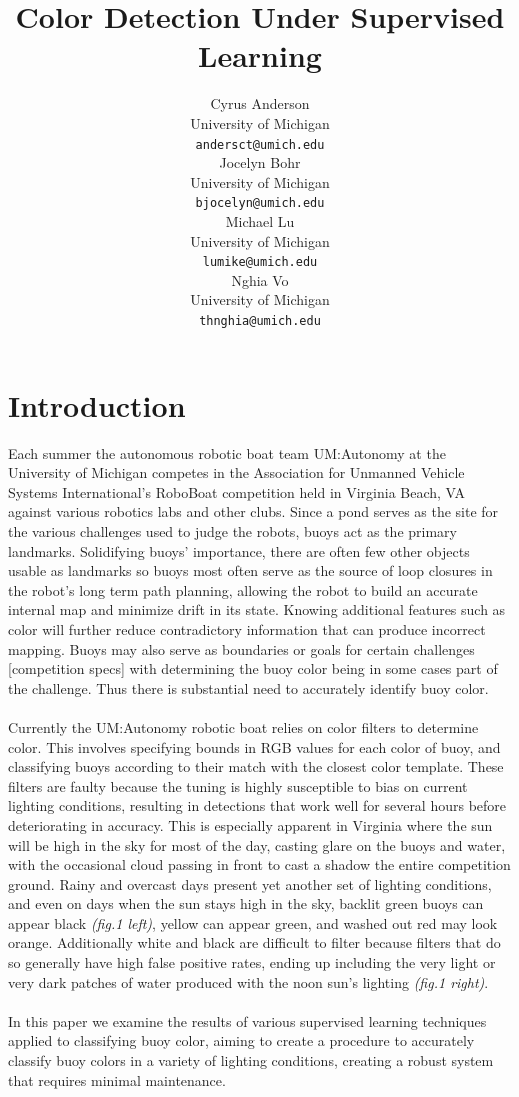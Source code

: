 \documentclass{article} %
\title{Color Detection Under Supervised Learning}
\author{
Cyrus Anderson \\
University of Michigan \\
\texttt{andersct@umich.edu} \\
\And
Jocelyn Bohr \\
University of Michigan \\
\texttt{bjocelyn@umich.edu} \\
\AND
Michael Lu \\
University of Michigan \\
\texttt{lumike@umich.edu} \\
\And
Nghia Vo \\
University of Michigan \\
\texttt{thnghia@umich.edu} \\
}
\begin{document}
\maketitle

\begin{abstract}

\end{abstract}

\section{Introduction}
Each summer the autonomous robotic boat team UM:Autonomy at the University of Michigan competes in the Association for Unmanned Vehicle Systems International's RoboBoat competition held in Virginia Beach, VA against various robotics labs and other clubs. Since a pond serves as the site for the various challenges used to judge the robots, buoys act as the primary landmarks. Solidifying buoys' importance, there are often few other objects usable as landmarks so buoys most often serve as the source of loop closures in the robot's long term path planning, allowing the robot to build an accurate internal map and minimize drift in its state. Knowing additional features such as color will further reduce contradictory information that can produce incorrect mapping. Buoys may also serve as boundaries or goals for certain challenges [competition specs] with determining the buoy color being in some cases part of the challenge. Thus there is substantial need to accurately identify 
buoy color.
\\\\Currently the UM:Autonomy robotic boat relies on color filters to determine color. This involves specifying bounds in RGB values for each color of buoy, and classifying buoys according to their match with the closest color template. These filters are faulty because the tuning is highly susceptible to bias on current lighting conditions, resulting in detections that work well for several hours before deteriorating in accuracy. This is especially apparent in Virginia where the sun will be high in the sky for most of the day, casting glare on the buoys and water, with the occasional cloud passing in front to cast a shadow the entire competition ground. Rainy and overcast days present yet another set of lighting conditions, and even on days when the sun stays high in the sky, backlit green buoys can appear black \textit{(fig.1 left)}, yellow can appear green, and washed out red may look orange. Additionally white and black are difficult to filter because filters that do so generally have high false positive rates, ending up including the very light or very dark patches of water produced with the 
noon sun's lighting \textit{(fig.1 right)}.
\\\\In this paper we examine the results of various supervised learning techniques applied to classifying buoy color, aiming to create a procedure to accurately classify buoy colors in a variety of lighting conditions, creating a robust system that requires minimal maintenance.
\end{document}
